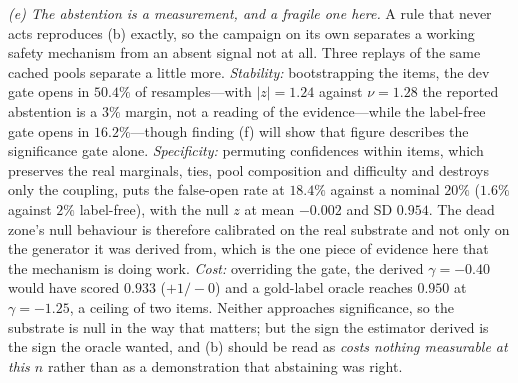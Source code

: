 \documentclass[twoside,11pt]{article}
\begin{document}
\emph{(e) The abstention is a measurement, and a fragile one here.} A rule that
never acts reproduces (b) exactly, so the campaign on its own separates a
working safety mechanism from an absent signal not at all. Three replays of the
same cached pools separate a little more. \emph{Stability:} bootstrapping the
items, the dev gate opens in $50.4\%$ of resamples---with $|z|=1.24$ against
$\nu=1.28$ the reported abstention is a $3\%$ margin, not a reading of the
evidence---while the label-free gate opens in $16.2\%$---though finding (f) will show
that figure describes the significance gate alone. \emph{Specificity:} permuting confidences within items, which preserves the
real marginals, ties, pool composition and difficulty and destroys only the
coupling, puts the false-open rate at $18.4\%$ against a nominal $20\%$
($1.6\%$ against $2\%$ label-free), with the null $z$ at mean $-0.002$ and SD
$0.954$. The dead zone's null behaviour is therefore calibrated on the real
substrate and not only on the generator it was derived from, which is the one
piece of evidence here that the mechanism is doing work. \emph{Cost:}
overriding the gate, the derived $\gamma=-0.40$ would have scored $0.933$
($+1/-0$) and a gold-label oracle reaches $0.950$ at $\gamma=-1.25$, a ceiling
of two items. Neither approaches significance, so the substrate is null in the
way that matters; but the sign the estimator derived is the sign the oracle
wanted, and (b) should be read as \emph{costs nothing measurable at this $n$}
rather than as a demonstration that abstaining was right.
\end{document}

